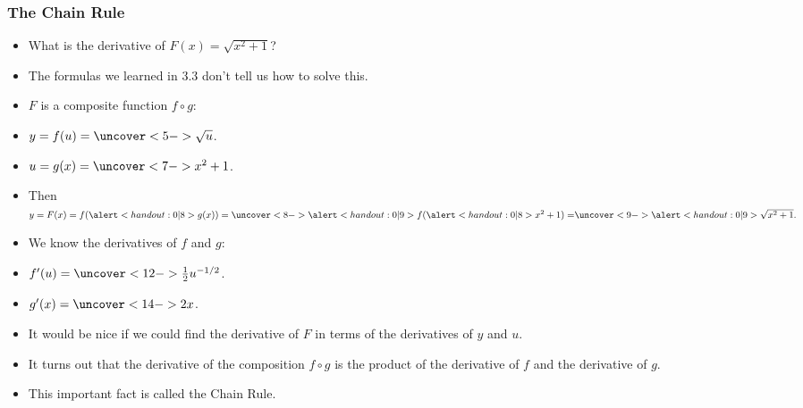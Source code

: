 \begin{frame}
\frametitle{The Chain Rule}
\begin{itemize}
\item  What is the derivative of $F(x) = \sqrt{x^2 + 1}$?
\item<2->  The formulas we learned in 3.3 don't tell us how to solve this.
\item<3->  $F$ is a composite function $f\circ g$:
\item<3-| alert@4-5,9,11-12>  $y = f(u) = \uncover<5->{\sqrt{u}}$.
\item<3-| alert@6-8,13-14>  $u = g(x) = \uncover<7->{x^2+1}$.
\item<3->  Then $y = F(x) = f(\alert<handout:0| 8>{g(x)}) = \uncover<8->{\alert<handout:0| 9>{f(\alert<handout:0| 8>{x^2+1}) =}}  \uncover<9->{\alert<handout:0| 9>{\sqrt{x^2+1}}.}$
\item<10->  We know the derivatives of $f$ and $g$:
\item<10-| alert@11-12>  $f'(u) = \uncover<12->{\frac{1}{2}u^{-1/2}}$.
\item<10-| alert@13-14>  $g'(x) = \uncover<14->{2x}$.
\item<15->  It would be nice if we could find the derivative of $F$ in terms of the derivatives of $y$ and $u$.
\item<16->  It turns out that the derivative of the composition $f\circ g$ is the product of the derivative of $f$ and the derivative of $g$.
\item<17->  This important fact is called the Chain Rule.
\end{itemize}
\end{frame}
